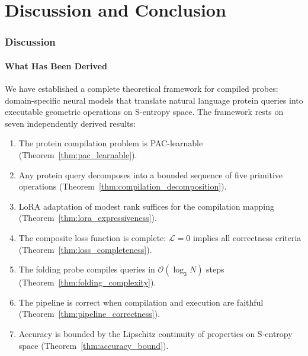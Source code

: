 \documentclass[11pt,twocolumn,a4paper]{article}
\theoremstyle{definition}
\theoremstyle{remark}
\newcommand{\loss}{\mathcal{L}}
\begin{document}
\part{Discussion and Conclusion}

\section{Discussion}
\label{sec:discussion}

\subsection{What Has Been Derived}

We have established a complete theoretical framework for compiled probes: domain-specific neural models that translate natural language protein queries into executable geometric operations on S-entropy space. The framework rests on seven independently derived results:

\begin{enumerate}
    \item The protein compilation problem is PAC-learnable (Theorem~\ref{thm:pac_learnable}).
    \item Any protein query decomposes into a bounded sequence of five primitive operations (Theorem~\ref{thm:compilation_decomposition}).
    \item LoRA adaptation of modest rank suffices for the compilation mapping (Theorem~\ref{thm:lora_expressiveness}).
    \item The composite loss function is complete: $\loss = 0$ implies all correctness criteria (Theorem~\ref{thm:loss_completeness}).
    \item The folding probe compiles queries in $\mathcal{O}(\log_3 N)$ steps (Theorem~\ref{thm:folding_complexity}).
    \item The pipeline is correct when compilation and execution are faithful (Theorem~\ref{thm:pipeline_correctness}).
    \item Accuracy is bounded by the Lipschitz continuity of properties on S-entropy space (Theorem~\ref{thm:accuracy_bound}).
\end{enumerate}
\end{document}
